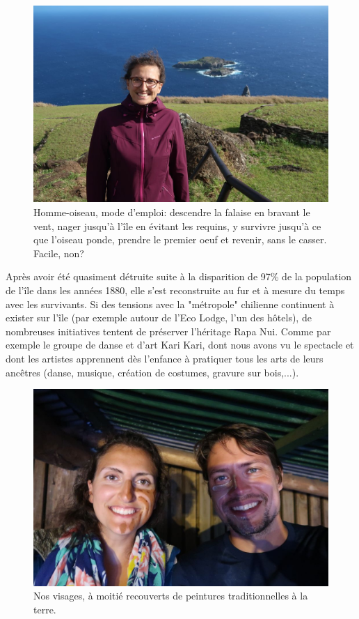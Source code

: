 \begin{figure}
\centering
\includegraphics{images/20180827_birdman.JPG}
\caption{Homme-oiseau, mode d'emploi: descendre la falaise en bravant le
vent, nager jusqu'à l'île en évitant les requins, y survivre jusqu'à ce
que l'oiseau ponde, prendre le premier oeuf et revenir, sans le casser.
Facile, non?}
\end{figure}

Après avoir été quasiment détruite suite à la disparition de 97\% de la
population de l'île dans les années 1880, elle s'est reconstruite au fur
et à mesure du temps avec les survivants. Si des tensions avec la
"métropole" chilienne continuent à exister sur l'île (par exemple autour
de l'Eco Lodge, l'un des hôtels), de nombreuses initiatives tentent de
préserver l'héritage Rapa Nui. Comme par exemple le groupe de danse et
d'art Kari Kari, dont nous avons vu le spectacle et dont les artistes
apprennent dès l'enfance à pratiquer tous les arts de leurs ancêtres
(danse, musique, création de costumes, gravure sur bois,...).

\begin{figure}
\centering
\includegraphics{images/20180827_karikari.JPG}
\caption{Nos visages, à moitié recouverts de peintures traditionnelles à
la terre.}
\end{figure}

